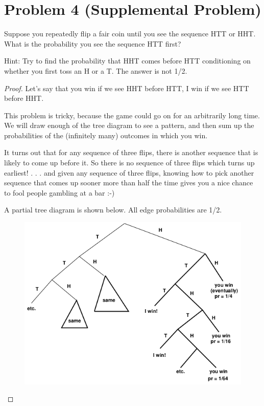 \documentclass[14pt]{extarticle}
\begin{document}
\section{Problem 4 (Supplemental Problem)}
Suppose you repeatedly flip a fair coin until you see the sequence HTT or HHT. What is the probability you see the sequence HTT first?

Hint: Try to find the probability that HHT comes before HTT conditioning on whether you first toss an H or a T. The answer is not 1/2.
\begin{proof}
Let's say that you win if we see HHT before HTT, I win if we see HTT before HHT.

This problem is tricky, because the game could go on for an arbitrarily long time. We will draw enough of the tree diagram to see a pattern, and then sum up the probabilities of the (infinitely many) outcomes in which you win.

It turns out that for any sequence of three flips, there is another sequence that is likely to come up before it. So there is no sequence of three flips which turns up earliest! . . . and given
any sequence of three flips, knowing how to pick another sequence that comes up sooner more than half the time gives you a nice chance to fool people gambling at a bar :-)

A partial tree diagram is shown below. All edge probabilities are 1/2.

\begin{figure}[ht!]
\centering
\includegraphics[scale=0.5]{htt.png}
\end{figure}


\end{proof}
\end{document}

